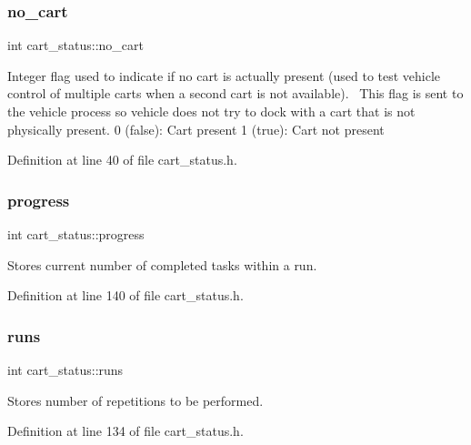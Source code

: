 \subsubsection{\texorpdfstring{no\+\_\+cart}{no\_cart}}
{\footnotesize\ttfamily int cart\+\_\+status\+::no\+\_\+cart\hspace{0.3cm}{\ttfamily [private]}}

Integer flag used to indicate if no cart is actually present (used to test vehicle control of multiple carts when a second cart is not available).~\newline
This flag is sent to the vehicle process so vehicle does not try to dock with a cart that is not physically present. 0 (false)\+: Cart present 1 (true)\+: Cart not present 

Definition at line 40 of file cart\+\_\+status.\+h.

\mbox{\label{classcart__status_a3d78cb0d051875d6e139d93cf2eb48f6}} 
\subsubsection{\texorpdfstring{progress}{progress}}
{\footnotesize\ttfamily int cart\+\_\+status\+::progress\hspace{0.3cm}{\ttfamily [private]}}

Stores current number of completed tasks within a run. 

Definition at line 140 of file cart\+\_\+status.\+h.

\mbox{\label{classcart__status_a0bec0d5ce6fd94ac91633b6594b62f77}} 
\subsubsection{\texorpdfstring{runs}{runs}}
{\footnotesize\ttfamily int cart\+\_\+status\+::runs\hspace{0.3cm}{\ttfamily [private]}}

Stores number of repetitions to be performed. 

Definition at line 134 of file cart\+\_\+status.\+h.

\mbox{\label{classcart__status_a6581ba4998e76807e8837f317ff5630f}} 
